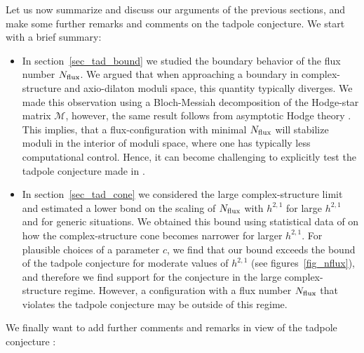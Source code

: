 \documentclass[12pt,a4paper]{article}
\numberwithin{equation}{section}
\begin{document}
Let us now summarize and discuss our arguments of the previous sections, and 
make some further remarks and comments on the tadpole conjecture. We start 
with a brief summary:
\begin{itemize}


\item In section~\ref{sec_tad_bound} we studied the boundary behavior of the 
flux number $N_{\rm flux}$. We argued that when approaching a boundary 
in complex-structure and axio-dilaton moduli space, this quantity typically diverges. 
We made this observation using a Bloch-Messiah decomposition 
of the Hodge-star matrix $\mathcal M$, however, the same 
result follows from asymptotic Hodge theory \cite{Schmid,CKS,Grimm:2020cda}.
This implies, that a flux-configuration with minimal $N_{\rm flux}$ will
stabilize moduli in the interior of moduli space, where one has typically
less computational control. 
Hence, it can become challenging to 
explicitly test the tadpole conjecture made in \cite{Bena:2020xrh}.



\item In section~\ref{sec_tad_cone} we considered the large complex-structure 
limit and estimated a lower bond on the scaling of $N_{\rm flux}$ with 
$h^{2,1}$ for large $h^{2,1}$ and for generic situations. We obtained this bound  using statistical data of 
\cite{Demirtas:2018akl}  on how the complex-structure cone becomes narrower 
for larger $h^{2,1}$. 
For plausible choices of a parameter $c$, 
we find that our bound exceeds the bound of the tadpole 
conjecture for moderate values of $h^{2,1}$ (see figures~\ref{fig_nflux}), and therefore 
we find support for the conjecture in the large complex-structure regime. 
However, a configuration with a flux number $N_{\rm flux}$ that violates 
the tadpole conjecture may 
be outside of this regime. 



\end{itemize}
We finally want to add further comments and remarks in view of the tadpole conjecture 
 \cite{Bena:2020xrh}:
\end{document}
